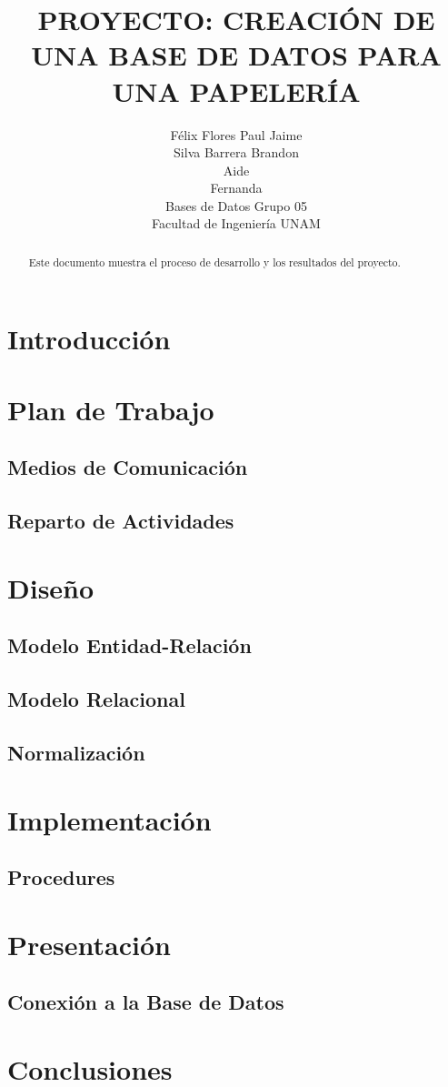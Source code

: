 ﻿\documentclass[10pt]{article}
\title{PROYECTO: CREACIÓN DE UNA BASE DE DATOS PARA UNA PAPELERÍA}
\author{Félix Flores Paul Jaime \\  Silva Barrera Brandon \\ Aide \\ Fernanda \\
Bases de Datos Grupo 05 \\ Facultad de Ingeniería UNAM}
\begin{document}
\maketitle
\begin{abstract}
Este documento muestra el proceso de desarrollo y los resultados del proyecto.
\end{abstract}

\newpage

\tableofcontents


\section{Introducción}

\section{Plan de Trabajo}
\subsection{Medios de Comunicación}
\subsection{Reparto de Actividades}


\section{Diseño}
\subsection{Modelo Entidad-Relación}
\subsection{Modelo Relacional}
\subsection{Normalización}

\section{Implementación}
\subsection{Procedures}


\section{Presentación}
\subsection{Conexión a la Base de Datos}


\section{Conclusiones}

 
\end{document}
